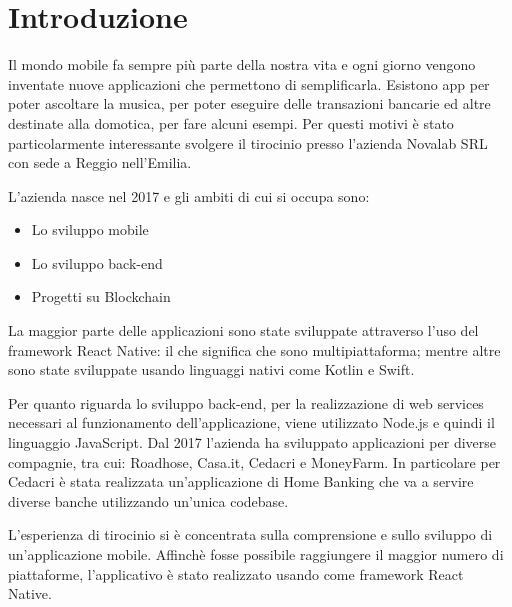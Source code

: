 \chapter*{Introduzione} %
\markboth{}{}
Il mondo mobile fa sempre pi\`u parte della nostra vita e ogni giorno vengono inventate nuove applicazioni che permettono di semplificarla. Esistono app
per poter ascoltare la musica, per poter eseguire delle transazioni bancarie ed altre destinate alla domotica, per fare alcuni esempi.
Per questi motivi \`e stato particolarmente interessante svolgere il tirocinio presso l'azienda Novalab SRL con sede a Reggio nell'Emilia.

L'azienda nasce nel 2017 e gli ambiti di cui si occupa sono:
\begin{itemize}
    \item Lo sviluppo mobile
    \item Lo sviluppo back-end
    \item Progetti su Blockchain
\end{itemize}
La maggior parte delle applicazioni sono state sviluppate attraverso l'uso del framework React Native: il che significa che sono multipiattaforma; mentre altre sono state sviluppate usando linguaggi nativi come Kotlin e Swift.

Per quanto riguarda lo sviluppo back-end, per la realizzazione di web services necessari al funzionamento dell'applicazione, viene utilizzato Node.js e quindi il linguaggio JavaScript. Dal
2017 l'azienda ha sviluppato applicazioni per diverse compagnie, tra cui: Roadhose, Casa.it, Cedacri e MoneyFarm. In particolare per Cedacri \`e stata realizzata
un'applicazione di Home Banking che va a servire diverse banche utilizzando un'unica codebase.

L'esperienza di tirocinio si \`e concentrata sulla comprensione e sullo sviluppo di un'applicazione mobile. Affinch\`e fosse possibile raggiungere il maggior numero di piattaforme,
l'applicativo \`e stato realizzato usando come framework React Native.

